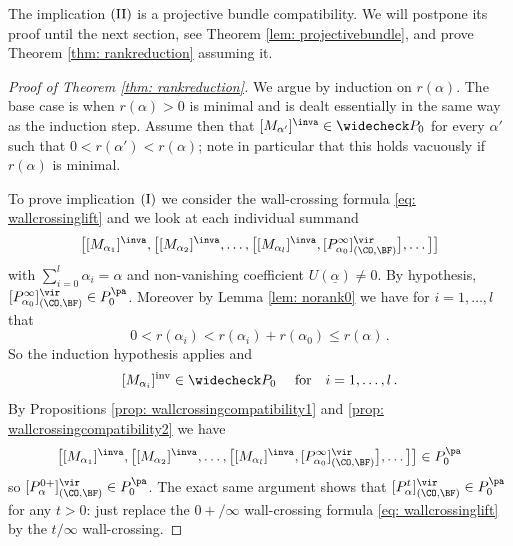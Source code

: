 The implication $(\textup{II})$ is a projective bundle compatibility. We will postpone its proof until the next section, see Theorem \ref{lem: projectivebundle}, and prove Theorem \ref{thm: rankreduction} assuming it.


\begin{proof}[Proof of Theorem \ref{thm: rankreduction}]
We argue by induction on $r(\alpha)$. The base case is when $r(\alpha)>0$ is minimal and is dealt essentially in the same way as the induction step. Assume then that $[M_{\alpha'}]^\inva \in \widecheck P_0$ for every $\alpha'$ such that $0<r(\alpha')<r(\alpha)$; note in particular that this holds vacuously if $r(\alpha)$ is minimal.

To prove implication $(\textup{I})$ we consider the wall-crossing formula \eqref{eq: wallcrossinglift} and we look at each individual summand
\[\big[[M_{\alpha_1}]^\inva,\big[[M_{\alpha_2}]^\inva,\ldots, \big[[M_{\alpha_l}]^\inva,[P_{\alpha_0}^\infty]^\vir_{(\CO,\BF)}  \big],\ldots \big]\big]\]
with $\sum_{i=0}^l \alpha_i=\alpha$ and non-vanishing coefficient $U(\underline{\alpha})\neq 0$. By hypothesis, $[P_{\alpha_0}^\infty]^\vir_{(\CO, \BF)} \in P_{0}^{\pa}$. Moreover by Lemma \ref{lem: norank0} we have for $i=1, \ldots, l$ that
\[0<r(\alpha_i)<r(\alpha_i)+r(\alpha_0)\leq r(\alpha)\,.\]
So the induction hypothesis applies and
\[[M_{\alpha_i}]^{\mathrm{inv}}\in \widecheck P_0\quad \textup{ for}\quad i=1, \ldots, l\,.\]
By Propositions \ref{prop: wallcrossingcompatibility1} and \ref{prop: wallcrossingcompatibility2} we have
\[\big[[M_{\alpha_1}]^\inva,\big[[M_{\alpha_2}]^\inva,\ldots, \big[[M_{\alpha_l}]^\inva,[P_{\alpha_0}^\infty]^\vir_{(\CO,\BF)}  \big],\ldots \big]\big]\in P_{0}^{\pa}\]
so $[P_\alpha^{0+}]^\vir_{(\CO, \BF)} \in P_{0}^{\pa}$. The exact same argument shows that $[P_\alpha^{t}]^\vir_{(\CO, \BF)} \in P_{0}^{\pa}$ for any $t>0$: just replace the ${0+}/\infty$ wall-crossing formula \eqref{eq: wallcrossinglift} by the $t/\infty$ wall-crossing.


\end{proof}
